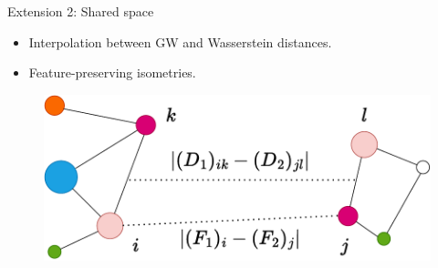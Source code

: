 \documentclass{beamer}
\begin{document}
\begin{frame}{Extension 2: Shared space}
  \begin{minipage}[t]{0.6\linewidth}
    \begin{itemize}
      \item Interpolation between GW and Wasserstein distances.
      \item Feature-preserving isometries.
    \end{itemize}
    \end{minipage}%
    \hfill%
    \hspace{-6cm}
    \begin{minipage}[t]{0.45\linewidth}
      \vspace{-0.cm}
    \begin{figure}
      \centering
      \includegraphics[width=\linewidth, keepaspectratio=true]{OT_new/fgw.pdf}
    \end{figure}
    \end{minipage}

\end{frame}
\end{document}
